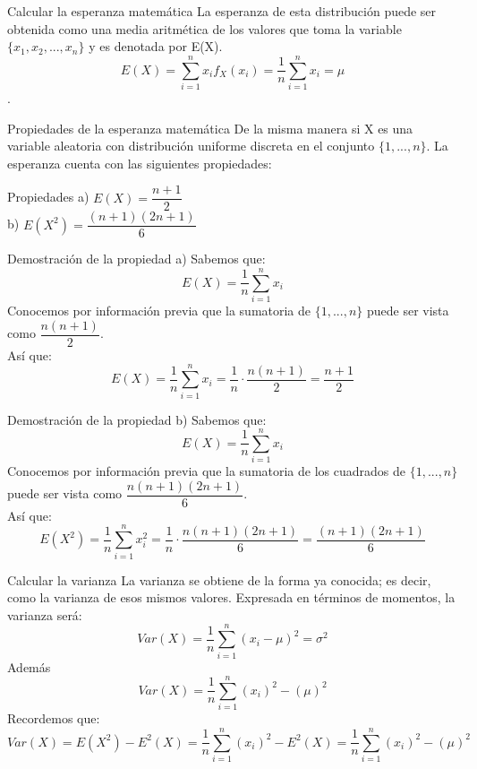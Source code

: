 \documentclass[11pt]{beamer}
\begin{document}
\begin{frame}{Calcular la esperanza matemática}
La esperanza de esta distribución puede ser obtenida como una media aritmética de los valores que toma la variable $\lbrace  x_{1},x_{2},...,x_{n} \rbrace$ y es denotada por E(X).
$$E(X)=\sum_{i=1}^{n}x_{i}f_X(x_{i})=\dfrac{1}{n}\sum_{i=1}^{n}x_{i}=\mu$$. 
\end{frame}

\begin{frame}{Propiedades de la esperanza matemática}
De la misma manera si X es una variable aleatoria  con distribución uniforme discreta en el conjunto $\lbrace 1,...,n \rbrace$. La esperanza cuenta con las siguientes propiedades:
\begin{block}{Propiedades}
a) $E(X) = \dfrac{n + 1}{2}$ \\
b) $E(X^2) = \dfrac{(n + 1)(2n + 1)}{6}$
\end{block}
\end{frame}

\begin{frame}{Demostración de la propiedad a)}
Sabemos que:
$$E(X)=\dfrac{1}{n}\sum_{i=1}^{n}x_{i}$$
Conocemos por información previa que la sumatoria de $\lbrace 1,...,n \rbrace$ puede ser vista como $\dfrac{n(n+1)}{2}$. \\
Así que: 
$$E(X)= \dfrac{1}{n}\sum_{i=1}^{n}x_{i} = \dfrac{1}{n} \cdot \dfrac{n(n+1)}{2} = \dfrac{n + 1}{2}$$
\end{frame}

\begin{frame}{Demostración de la propiedad b)}
Sabemos que:
$$E(X)=\dfrac{1}{n}\sum_{i=1}^{n}x_{i}$$
Conocemos por información previa que la sumatoria de los cuadrados de $\lbrace 1,...,n \rbrace$ puede ser vista como $\dfrac{n(n+1)(2n+1)}{6}$.\\
Así que:
$$E(X^2)= \dfrac{1}{n}\sum_{i=1}^{n}x^2_{i} = \dfrac{1}{n} \cdot \dfrac{n(n+1)(2n+1)}{6}  = \dfrac{(n + 1)(2n + 1)}{6}$$
\end{frame}

\begin{frame}{Calcular la varianza}
La varianza se obtiene de la forma ya conocida; es decir, como la varianza de esos mismos valores. Expresada en términos de momentos, la varianza será:
$$Var(X)=\dfrac{1}{n}\sum_{i=1}^{n}(x_{i}-\mu)^{2}=\sigma ^{2}$$
Además 
$$Var(X) = \dfrac{1}{n}\sum_{i=1}^{n}(x_{i})^2 - (\mu)^{2} $$
Recordemos que:
$$Var(X) = E(X^{2}) - E^{2}(X) = \frac{1}{n}\sum_{i=1}^{n} (x_i)^{2}- E^{2}(X) =  \frac{1}{n}\sum_{i=1}^{n} (x_i)^{2} - (\mu)^{2}$$
\end{frame} 
\end{document}

